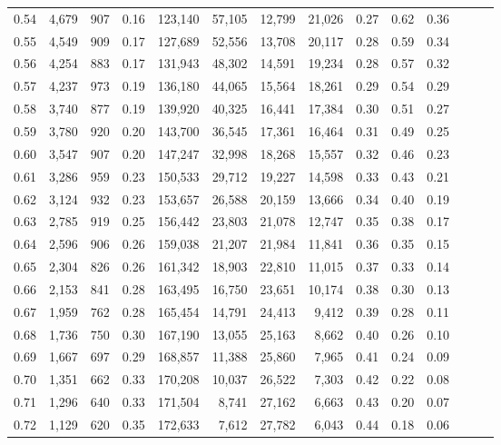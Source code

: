 \begin{tabular}{rrrrrrrrrrrrrr}
0.54 &  4,679 &  907 &  0.16 &  123,140 &   57,105 &  12,799 &  21,026 &  0.27 &  0.62 &      0.36 \\
0.55 &  4,549 &  909 &  0.17 &  127,689 &   52,556 &  13,708 &  20,117 &  0.28 &  0.59 &      0.34 \\
0.56 &  4,254 &  883 &  0.17 &  131,943 &   48,302 &  14,591 &  19,234 &  0.28 &  0.57 &      0.32 \\
0.57 &  4,237 &  973 &  0.19 &  136,180 &   44,065 &  15,564 &  18,261 &  0.29 &  0.54 &      0.29 \\
0.58 &  3,740 &  877 &  0.19 &  139,920 &   40,325 &  16,441 &  17,384 &  0.30 &  0.51 &      0.27 \\
0.59 &  3,780 &  920 &  0.20 &  143,700 &   36,545 &  17,361 &  16,464 &  0.31 &  0.49 &      0.25 \\
0.60 &  3,547 &  907 &  0.20 &  147,247 &   32,998 &  18,268 &  15,557 &  0.32 &  0.46 &      0.23 \\
0.61 &  3,286 &  959 &  0.23 &  150,533 &   29,712 &  19,227 &  14,598 &  0.33 &  0.43 &      0.21 \\
0.62 &  3,124 &  932 &  0.23 &  153,657 &   26,588 &  20,159 &  13,666 &  0.34 &  0.40 &      0.19 \\
0.63 &  2,785 &  919 &  0.25 &  156,442 &   23,803 &  21,078 &  12,747 &  0.35 &  0.38 &      0.17 \\
0.64 &  2,596 &  906 &  0.26 &  159,038 &   21,207 &  21,984 &  11,841 &  0.36 &  0.35 &      0.15 \\
0.65 &  2,304 &  826 &  0.26 &  161,342 &   18,903 &  22,810 &  11,015 &  0.37 &  0.33 &      0.14 \\
0.66 &  2,153 &  841 &  0.28 &  163,495 &   16,750 &  23,651 &  10,174 &  0.38 &  0.30 &      0.13 \\
0.67 &  1,959 &  762 &  0.28 &  165,454 &   14,791 &  24,413 &   9,412 &  0.39 &  0.28 &      0.11 \\
0.68 &  1,736 &  750 &  0.30 &  167,190 &   13,055 &  25,163 &   8,662 &  0.40 &  0.26 &      0.10 \\
0.69 &  1,667 &  697 &  0.29 &  168,857 &   11,388 &  25,860 &   7,965 &  0.41 &  0.24 &      0.09 \\
0.70 &  1,351 &  662 &  0.33 &  170,208 &   10,037 &  26,522 &   7,303 &  0.42 &  0.22 &      0.08 \\
0.71 &  1,296 &  640 &  0.33 &  171,504 &    8,741 &  27,162 &   6,663 &  0.43 &  0.20 &      0.07 \\
0.72 &  1,129 &  620 &  0.35 &  172,633 &    7,612 &  27,782 &   6,043 &  0.44 &  0.18 &      0.06 \\

\end{tabular}
